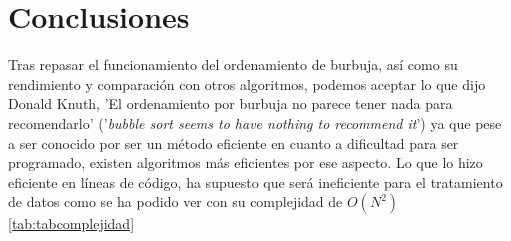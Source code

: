 \documentclass[conference, a4paper]{IEEEtran}
\begin{document}
\section{Conclusiones}

Tras repasar el funcionamiento del ordenamiento de burbuja, así como su rendimiento y comparación con otros algoritmos, podemos aceptar lo que dijo Donald Knuth, 'El ordenamiento por burbuja no parece tener nada para recomendarlo' ('\textit{bubble sort seems to have nothing to recommend it}') ya que pese a ser conocido por ser un método eficiente en cuanto a dificultad para ser programado, existen algoritmos más eficientes por ese aspecto.\cite{owen_bubblesort} Lo que lo hizo eficiente en líneas de código, ha supuesto que será ineficiente para el tratamiento de datos como se ha podido ver con su complejidad de \(O(N^2)\) \ref{tab:tabcomplejidad}
\end{document}
